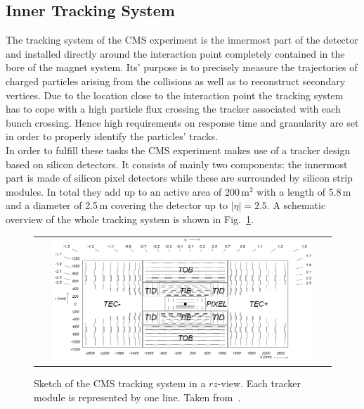 \subsection{Inner Tracking System}
\label{subsec:cms_tracker}
The tracking system of the CMS experiment is the innermost part of the detector and installed directly around the interaction point completely contained in the bore of the magnet system. Its' purpose is to precisely measure the trajectories of charged particles arising from the collisions as well as to reconstruct secondary vertices. Due to the location close to the interaction point the tracking system has to cope with a high particle flux crossing the tracker associated with each bunch crossing. Hence high requirements on response time and granularity are set in order to properly identify the particles' tracks. \\
In order to fulfill these tasks the CMS experiment makes use of a tracker design based on silicon detectors. It consists of mainly two components: the innermost part is made of silicon pixel detectors while these are surrounded by silicon strip modules. In total they add up to an active area of 200\,$\mathrm{m}^2$ with a length of 5.8\,m and a diameter of 2.5\,m covering the detector up to $|\eta| = 2.5$. A schematic overview of the whole tracking system is shown in Fig.~\ref{fig:CMS_tracker}. 
\begin{figure}[!tp]
  \centering
  \begin{tabular}{c}
    \includegraphics[width=0.9\textwidth]{figures/Figures_Experimental_Apparatus_Tracker.png}
  \end{tabular}
  \caption{Sketch of the CMS tracking system in a $rz$-view. Each tracker module is represented by one line. Taken from~\cite{Chatrchyan:2008zzk}.}
  \label{fig:CMS_tracker}
\end{figure}
